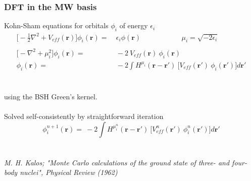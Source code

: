 \documentclass[mathserif]{beamer}
\begin{document}
\begin{frame}
	\frametitle{DFT in the MW basis}
	Kohn-Sham equations for orbitals $\phi_i$ of energy $\epsilon_i$
	\begin{align}
		\nonumber
		\big[-\frac{1}{2}\nabla^2 + V_{eff}(\boldsymbol{r})\big]
		\phi_i(\boldsymbol{r}) =&\ \epsilon_i \phi(\boldsymbol{r})\ \ \ \ \ \ \ \ \ \ \ \ 
		\ \ \ \ \ \ \ \ \ \ \ \ \ \ \mu_i = \sqrt{-2\epsilon_i}\\
		\nonumber
		\ & \ \\
		\nonumber
		\big[-\nabla^2 + \mu_i^2\big]\phi_i(\boldsymbol{r}) =&\ 
		    -2\ V_{eff}(\boldsymbol{r})\ \phi_i(\boldsymbol{r})\\
		\nonumber
		\phi_i(\boldsymbol{r}) =&\ -2\int H^{\mu_i}(\boldsymbol{r}-\boldsymbol{r}')\
		    \Big[V_{eff}(\boldsymbol{r}')\ \phi_i(\boldsymbol{r}')\Big] d\boldsymbol{r}'
	\end{align}
	\ \\
	\ \\
	using the BSH Green's kernel.\\
	\ \\
	\pause
	Solved self-consistently by straightforward iteration\\
	\begin{equation}
	    \nonumber
	    \phi^{n+1}_i(\boldsymbol{r}) =\ -2\int H^{\mu^n_i}(\boldsymbol{r}-\boldsymbol{r}')\
		\Big[V^n_{eff}(\boldsymbol{r}')\ \phi^n_i(\boldsymbol{r}')\Big] d\boldsymbol{r}'
	\end{equation}
	\ \\
	\ \\
	\tiny \it{M. H. Kalos; "Monte Carlo calculations of the ground state of three- and 
	    four-body nuclei", Physical Review (1962)}
\end{frame}
\end{document}
